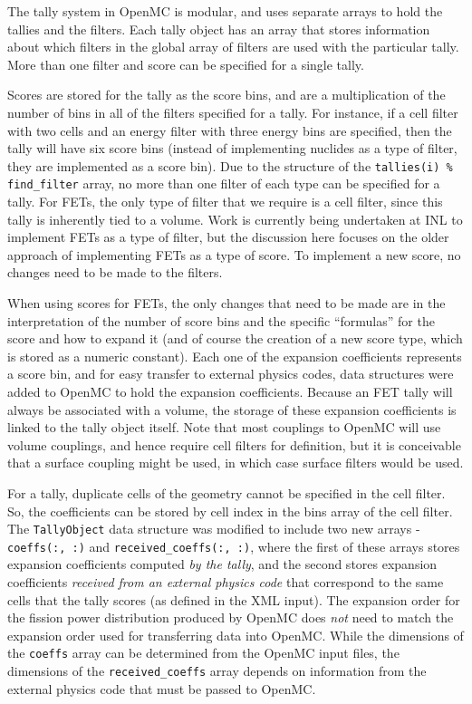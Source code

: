 \documentclass[10pt]{article}
\numberwithin{equation}{section} %
\begin{document}
The tally system in OpenMC is modular, and uses separate arrays to hold the tallies and the filters. Each tally object has an array that stores information about which filters in the global array of filters are used with the particular tally. More than one filter and score can be specified for a single tally. 

Scores are stored for the tally as the score bins, and are a multiplication of the number of bins in all of the filters specified for a tally. For instance, if a cell filter with two cells and an energy filter with three energy bins are specified, then the tally will have six score bins (instead of implementing nuclides as a type of filter, they are implemented as a score bin). Due to the structure of the {\tt tallies(i) \% find\_filter} array, no more than one filter of each type can be specified for a tally. For FETs, the only type of filter that we require is a cell filter, since this tally is inherently tied to a volume. Work is currently being undertaken at INL to implement FETs as a type of filter, but the discussion here focuses on the older approach of implementing FETs as a type of score. To implement a new score, no changes need to be made to the filters.  

When using scores for FETs, the only changes that need to be made are in the interpretation of the number of score bins and the specific ``formulas'' for the score and how to expand it (and of course the creation of a new score type, which is stored as a numeric constant). Each one of the expansion coefficients represents a score bin, and for easy transfer to external physics codes, data structures were added to OpenMC to hold the expansion coefficients. Because an FET tally will always be associated with a volume, the storage of these expansion coefficients is linked to the tally object itself. Note that most couplings to OpenMC will use volume couplings, and hence require cell filters for definition, but it is conceivable that a surface coupling might be used, in which case surface filters would be used.
 
For a tally, duplicate cells of the geometry cannot be specified in the cell filter. So, the coefficients can be stored by cell index in the bins array of the cell filter. The {\tt TallyObject} data structure was modified to include two new arrays - {\tt coeffs(:, :)} and {\tt received\_coeffs(:, :)}, where the first of these arrays stores expansion coefficients computed {\it by the tally}, and the second stores expansion coefficients {\it received from an external physics code} that correspond to the same cells that the tally scores (as defined in the XML input). The expansion order for the fission power distribution produced by OpenMC does {\it not} need to match the expansion order used for transferring data into OpenMC. While the dimensions of the {\tt coeffs} array can be determined from the OpenMC input files, the dimensions of the {\tt received\_coeffs} array depends on information from the external physics code that must be passed to OpenMC.
\end{document}
